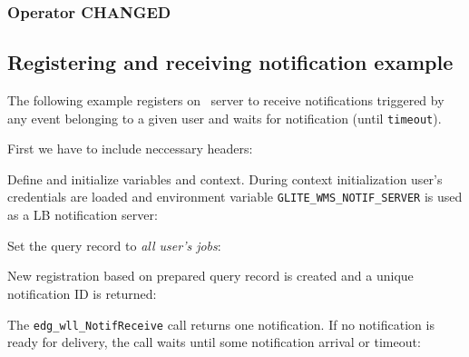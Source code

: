 \subsubsection{Operator CHANGED}

\subsection{Registering and receiving notification example}

The following example registers on \LB\ server to receive
notifications triggered by any event belonging to a
given user and waits for notification (until \verb'timeout').


First we have to include neccessary headers:


Define and initialize variables and context. During context
initialization user's credentials are loaded and environment variable
\verb'GLITE_WMS_NOTIF_SERVER' is used as a LB notification server:
 


Set the query record to \emph{all user's jobs}:


New registration based on prepared query record is created and a
unique notification ID is returned: 


The \verb'edg_wll_NotifReceive' call returns one notification. If no notification is 
ready for delivery, the call waits until some notification arrival or timeout:



